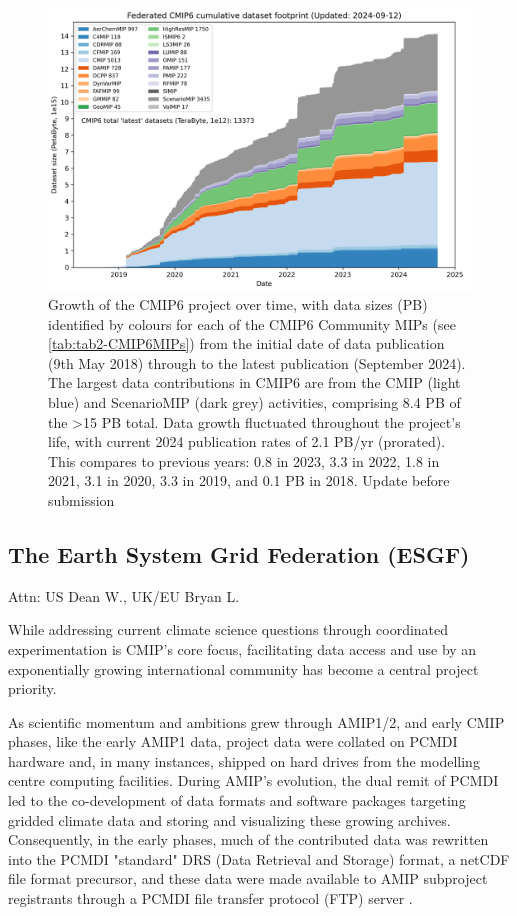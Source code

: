\documentclass[gmd, preprint]{copernicus}
\def\cred#1{{\color{red}#1}}
\begin{document}
\begin{figure}
    \centering
    \includegraphics[width=1\linewidth]{240912T141943_ESGF-PublicationStatsPB.png}
    \caption{Growth of the CMIP6 project over time, with data sizes (PB) identified by colours for each of the CMIP6 Community MIPs (see \autoref{tab:tab2-CMIP6MIPs}) from the initial date of data publication (9th May 2018) through to the latest publication (September 2024). The largest data contributions in CMIP6 are from the CMIP (light blue) and ScenarioMIP (dark grey) activities, comprising 8.4 PB of the >15 PB total. Data growth fluctuated throughout the project's life, with current 2024 publication rates of 2.1 PB/yr (prorated). This compares to previous years: 0.8 in 2023, 3.3 in 2022, 1.8 in 2021, 3.1 in 2020, 3.3 in 2019, and 0.1 PB in 2018. \cred{Update before submission}}
    \label{fig:fig2-CMIP6DataGrowth}
\end{figure}


\subsection{The Earth System Grid Federation (ESGF)}
\label{sec:earthSystemGridFederation}
\cred{Attn: US Dean W., UK/EU Bryan L.}

While addressing current climate science questions through coordinated experimentation is CMIP's core focus, facilitating data access and use by an exponentially growing international community has become a central project priority. 

As scientific momentum and ambitions grew through AMIP1/2, and early CMIP phases, like the early AMIP1 data, project data were collated on PCMDI hardware and, in many instances, shipped on hard drives from the modelling centre computing facilities. During AMIP's evolution, the dual remit of PCMDI led to the co-development of data formats and software packages targeting gridded climate data and storing and visualizing these growing archives. Consequently, in the early phases, much of the contributed data was rewritten into the PCMDI "standard" DRS (Data Retrieval and Storage) format, a netCDF file format precursor, and these data were made available to AMIP subproject registrants through a PCMDI file transfer protocol (FTP) server \citep[see \autoref{tab:tab1-MIPsThroughTime};][]{gates_amip_1995}.
\end{document}
